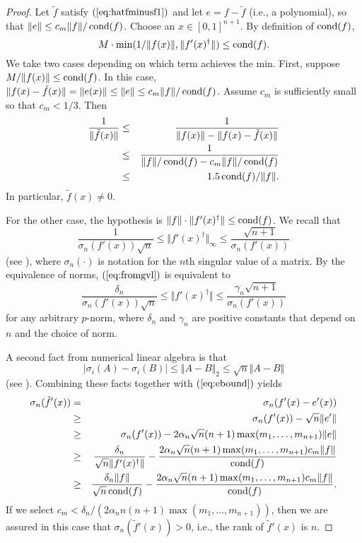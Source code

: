 \documentclass{article}
\newcommand{\cond}[1]{\mathop{\rm{cond}}(#1)}
\newcommand{\mpinv}[1]{#1^{\dagger}}  \newcommand\eps{\epsilon}
\newcommand\eref[1]{$(\ref{#1})$}
\begin{document}
\begin{proof}
Let $\tilde f$ satisfy \eref{eq:hatfminusf1} and
let $e=f-\tilde f$ (i.e., a polynomial), so that
$\Vert e\Vert\le c_m\Vert f\Vert /\cond{f}$.
Choose an
$x\in[0,1]^{n+1}$.  By definition of $\cond{f}$,
$$M\cdot\min(1/\Vert f(x)\Vert,\Vert \mpinv{f'(x)}\Vert)\le\cond{f}.$$
We take two cases depending on which term achieves the min.
First, suppose $M/\Vert f(x)\Vert\le\cond{f}$.  In this case,
$\Vert f(x)-\tilde f(x)\Vert=\Vert e(x)\Vert \le \Vert e\Vert
\le c_m\Vert f\Vert/\cond{f}$. 
 Assume $c_m$ is sufficiently small so that $c_m<1/3$.
Then
\begin{eqnarray*}
\frac{1}{\Vert \tilde f(x)\Vert} &\le &\frac{1}{\Vert f(x)\Vert-\Vert f(x)-\tilde
f(x)\Vert} \\
&\le & \frac{1}{\Vert f\Vert/\cond{f}-c_m\Vert f\Vert/\cond{f}} \\
&\le & 1.5\cond{f}/\Vert f\Vert.
\end{eqnarray*}
In particular, $\tilde f(x)\ne 0$.

For the other case, the hypothesis is
$\Vert f\Vert\cdot \Vert \mpinv{f'(x)}\Vert \le \cond{f}$.
We recall that 
\begin{equation}
\label{eq:fromgvl}
\frac{1}{\sigma_n(f'(x))\sqrt{n}}
\le \Vert \mpinv{f'(x)}\Vert_\infty \le
\frac{\sqrt{n+1}}{\sigma_n(f'(x))}
\end{equation}
(see \cite[(2.3.11) and \S5.5.4]{gvl}),
where $\sigma_n(\cdot)$ is notation for the $n$th
singular value of a matrix.  By the equivalence of norms, \eref{eq:fromgvl} is equivalent to
\[
\frac{\delta_n}{\sigma_n(f'(x))\sqrt{n}}
\le \Vert \mpinv{f'(x)}\Vert \le
\frac{\gamma_n\sqrt{n+1}}{\sigma_n(f'(x))}
\]
for any arbitrary $p$-norm, where $\delta_n$ and $\gamma_n$ are positive constants that depend on $n$ and the choice of norm.



A second fact from numerical linear algebra is that
$$|\sigma_i(A)-\sigma_i(B)|\le \Vert A-B\Vert_2\le \sqrt{n}\Vert A-B\Vert$$
(see \cite[(2.3.11) and Cor.~8.6.2]{gvl}).  
Combining these facts together with \eref{eq:ebound} yields
\begin{eqnarray*}
\sigma_n(\tilde f'(x)) &=& \sigma_n(f'(x)-e'(x)) \\
&\ge & \sigma_n(f'(x))- \sqrt{n}\Vert e'\Vert \\
&\ge & \sigma_n(f'(x))- 2\alpha_n\sqrt{n}(n+1)\max(m_1,\ldots,m_{n+1}) \Vert e\Vert \\
&\ge & \frac{\delta_n}{\sqrt{n}\Vert\mpinv{f'(x)}\Vert} - \frac{2\alpha_n\sqrt{n}(n+1)\max(m_1,\ldots,m_{n+1})c_m\Vert f\Vert}{\cond{f}}
\\
&\ge & \frac{\delta_n \Vert f\Vert}{\sqrt{n}\cond{f}} - \frac{2\alpha_n\sqrt{n}(n+1)\max(m_1,\ldots,m_{n+1})c_m\Vert f\Vert}{\cond{f}}.
\end{eqnarray*}
If we select $c_m<\delta_n/\left(2\alpha_n n(n+1)\max(m_1,\ldots,m_{n+1}) \right)$, then we are assured in this case
that $\sigma_n(\tilde f'(x))>0$, i.e., the rank of $\tilde f'(x)$ is
$n$.


\end{proof}
\end{document}
